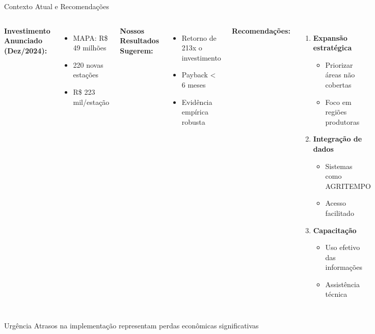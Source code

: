 \documentclass[10pt,aspectratio=169]{beamer}
\begin{document}
\begin{frame}{Contexto Atual e Recomendações}
\begin{columns}
\textbf{Investimento Anunciado (Dez/2024):}
\begin{itemize}
    \item MAPA: R\$ 49 milhões
    \item 220 novas estações
    \item R\$ 223 mil/estação
\end{itemize}

\vspace{0.3cm}
\textbf{Nossos Resultados Sugerem:}
\begin{itemize}
    \item Retorno de 213x o investimento
    \item Payback < 6 meses
    \item Evidência empírica robusta
\end{itemize}

\textbf{Recomendações:}
\begin{enumerate}
    \item \textbf{Expansão estratégica}
    \begin{itemize}
        \item Priorizar áreas não cobertas
        \item Foco em regiões produtoras
    \end{itemize}
    
    \item \textbf{Integração de dados}
    \begin{itemize}
        \item Sistemas como AGRITEMPO
        \item Acesso facilitado
    \end{itemize}
    
    \item \textbf{Capacitação}
    \begin{itemize}
        \item Uso efetivo das informações
        \item Assistência técnica
    \end{itemize}
\end{enumerate}
\end{columns}

\begin{block}{Urgência}
Atrasos na implementação representam perdas econômicas significativas
\end{block}
\end{frame}
\end{document}
